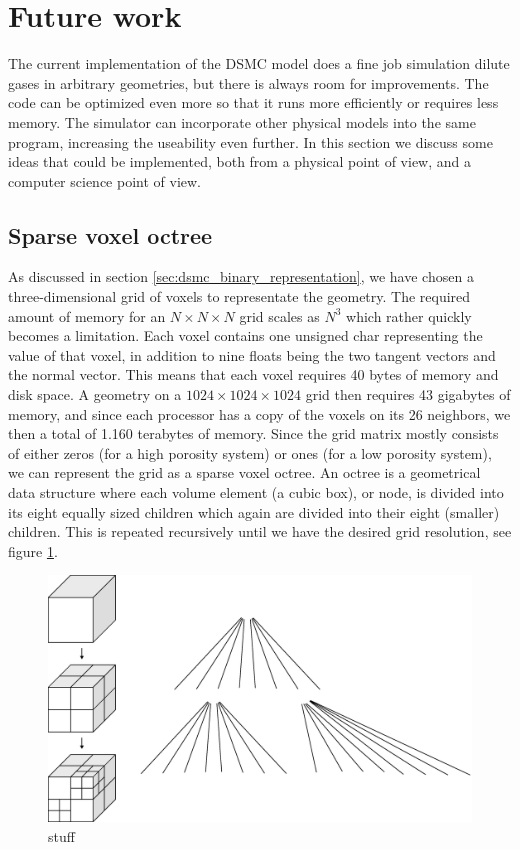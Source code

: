 \section{Future work}
The current implementation of the DSMC model does a fine job simulation dilute gases in arbitrary geometries, but there is always room for improvements. The code can be optimized even more so that it runs more efficiently or requires less memory. The simulator can incorporate other physical models into the same program, increasing the useability even further. In this section we discuss some ideas that could be implemented, both from a physical point of view, and a computer science point of view.
\subsection{Sparse voxel octree}
As discussed in section \ref{sec:dsmc_binary_representation}, we have chosen a three-dimensional grid of voxels to representate the geometry. The required amount of memory for an $N\times N\times N$ grid scales as $N^3$ which rather quickly becomes a limitation. Each voxel contains one unsigned char representing the value of that voxel, in addition to nine floats being the two tangent vectors and the normal vector. This means that each voxel requires 40 bytes of memory and disk space. A geometry on a $1024\times1024\times1024$ grid then requires 43 gigabytes of memory, and since each processor has a copy of the voxels on its 26 neighbors, we then a total of 1.160 terabytes of memory. Since the grid matrix mostly consists of either zeros (for a high porosity system) or ones (for a low porosity system), we can represent the grid as a sparse voxel octree\cite{laine2011efficient}. An octree is a geometrical data structure where each volume element (a cubic box), or node, is divided into its eight equally sized children which again are divided into their eight (smaller) children.  This is repeated recursively until we have the desired grid resolution, see figure \ref{fig:future_work_octree}. 
\begin{figure}[h]
\begin{center}
\includegraphics[width=\textwidth, trim=0cm 0cm 0cm 0cm, clip]{figures/octree.eps}
\end{center}
\caption{stuff}
\label{fig:future_work_octree}
\end{figure}
